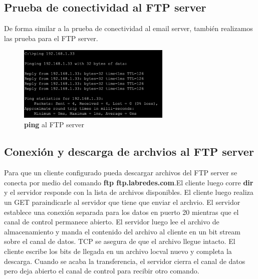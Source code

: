 \documentclass[10pt]{article}
\begin{document}
\subsection{Prueba de conectividad al FTP server}
De forma similar a la prueba de conectividad al email server, también realizamos las prueba para el FTP server. 

\begin{figure}[H]
    \centering
    \includegraphics[width=0.65\textwidth]{lab-01-screenshots/46-2-ping-ftp}
    \caption{\textbf{ping} al FTP server}
\end{figure}

\subsection{Conexión y descarga de archvios al FTP server}
Para que un cliente configurado pueda descargar archivos del FTP server se conecta por medio del comando \textbf{ftp ftp.labredes.com}.El cliente luego corre \textbf{dir} y el servidor responde con la lista de archivos disponibles. El cliente luego realiza un GET paraindicarle al servidor que tiene que enviar el archvio. El servidor establece una   conexión separada para los datos en puerto 20 mientras que el canal de control permanece abierto. El servidor luego lee el archivo de almacenamiento y manda el contenido del archivo al cliente en un bit stream sobre el canal de datos. TCP se asegura de que el archivo llegue intacto. El cliente escribe los bits de llegada en un archivo locval nuevo y completa la descarga. Cuando se acaba la transferencia, el servidor cierra el canal de datos pero deja abierto el canal de control para recibir otro comando. 
\end{document}
